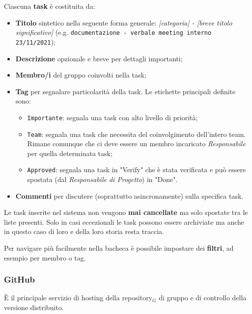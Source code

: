 Ciascuna \textbf{task} è costituita da:
\begin{itemize}
  \item \textbf{Titolo} sintetico nella seguente forma generale: \textit{[categoria] - [breve titolo significativo]} (e.g. \texttt{documentazione - verbale meeting interno 23/11/2021});
  \item \textbf{Descrizione} opzionale e breve per dettagli importanti;
  \item \textbf{Membro/i} del gruppo coinvolti nella task;
  \item \textbf{Tag} per segnalare particolarità della task. Le etichette principali definite sono:
  \begin{itemize}
    \item \texttt{Importante}: segnala una task con alto livello di priorità;
    \item \texttt{Team}: segnala una task che necessita del coinvolgimento dell'intero team. Rimane comunque che ci deve essere un membro incaricato \textit{Responsabile} per quella determinata task;
    \item \texttt{Approved}: segnala una task in "Verify" che è stata verificata e può essere spostata (dal \textit{Responsabile di Progetto}) in "Done".
  \end{itemize}
  \item \textbf{Commenti} per discutere (soprattutto asincronamente) sulla specifica task.
\end{itemize}
Le task inserite nel sistema non vengono \textbf{mai cancellate} ma solo spostate tra le liste presenti. Solo in casi eccezionali le task possono essere archiviate ma anche in questo caso di loro e della loro storia resta traccia.

Per navigare più facilmente nella bacheca è possibile impostare dei \textbf{filtri}, ad esempio per membro o tag.

\subsubsection{GitHub}
È il principale servizio di hosting della repository$_G$ di gruppo e di controllo della versione distribuito.

